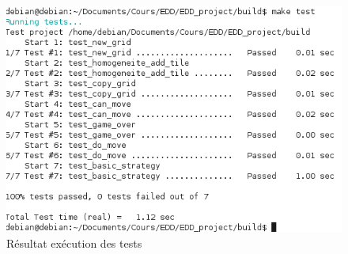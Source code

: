 \documentclass[12pt]{article}
\begin{document}
\begin{figure}
   \caption{\label{test} R\'esultat ex\'ecution des tests}
   \includegraphics[scale=0.6]{test.png}
\end{figure}
\end{document}
